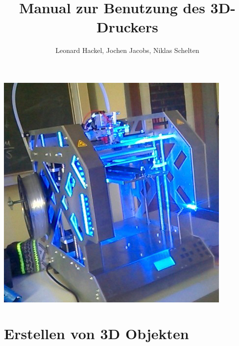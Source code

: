 \documentclass[10pt,a4paper]{scrartcl}
\author{Leonard Hackel, Jochen Jacobs, Niklas Schelten}
\title{Manual zur Benutzung des 3D-Druckers}
\begin{document}
\maketitle
\begin{center}
\includegraphics[scale=0.75]{res/31_1.jpg}
\end{center}
\pagebreak
\tableofcontents
\pagebreak
\section{Erstellen von 3D Objekten}
\pagebreak
\end{document}
